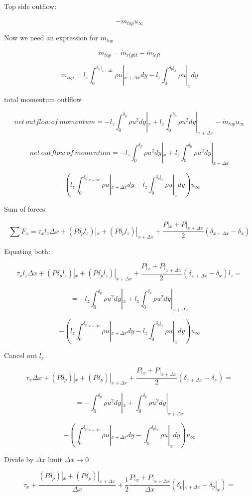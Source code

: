 \documentclass[11pt]{article}
\begin{document}
Top side outflow:

$$- \dot{m}_{top} u_\infty $$

Now we need an expression for $\dot{m}_{top}$

$$\dot{m}_{top} = \dot{m}_{right} - \dot{m}_{left}$$

$$\dot{m}_{top} = l_z \int_0^{\delta_p |_{x+\Delta x}} \rho u |_{x+ \Delta x}dy -  l_z \int_0^{\delta_p |_{x}} \rho u |_{x}dy$$

total momentum outlflow

$$net \ outflow \ of  \ momentum = - l_z \int_0^{\delta_p} \rho u^2 dy |_x +  l_z \int_0^{\delta_p} \rho u^2 dy |_{x+\Delta x} - \dot{m}_{top} u_\infty  $$

$$net \ outflow \ of  \ momentum = - l_z \int_0^{\delta_p} \rho u^2 dy |_x +  l_z \int_0^{\delta_p} \rho u^2 dy |_{x+\Delta x} $$

$$ - ( l_z \int_0^{\delta_p |_{x+\Delta x}} \rho u |_{x+ \Delta x}dy -  l_z \int_0^{\delta_p |_{x}} \rho u |_{x}dy) u_\infty  $$

Sum of forces:

$$\sum F_x = \tau_x l_z \Delta x + (P \delta_p l_z)|_x +  (P \delta_p l_z)|_{x+\Delta x} + \frac{P|_x + P|_{x+\Delta x}}{2} (\delta_{x+\Delta x} - \delta_{x}) $$

Equating both:

$$\tau_x l_z \Delta x + (P \delta_p l_z)|_x +  (P \delta_p l_z)|_{x+\Delta x} + \frac{P|_x + P|_{x+\Delta x}}{2} (\delta_{x+\Delta x} - \delta_{x}) l_z= $$

$$= - l_z \int_0^{\delta_p} \rho u^2 dy |_x +  l_z \int_0^{\delta_p} \rho u^2 dy |_{x+\Delta x} $$

$$ - ( l_z \int_0^{\delta_p |_{x+\Delta x}} \rho u |_{x+ \Delta x}dy -  l_z \int_0^{\delta_p |_{x}} \rho u |_{x}dy) u_\infty  $$

Cancel out $l_z$

$$\tau_x \Delta x + (P \delta_p )|_x +  (P \delta_p )|_{x+\Delta x} + \frac{P|_x + P|_{x+\Delta x}}{2} (\delta_{x+\Delta x} - \delta_{x}) = $$

$$= - \int_0^{\delta_p} \rho u^2 dy |_x +   \int_0^{\delta_p} \rho u^2 dy |_{x+\Delta x} $$

$$ - (  \int_0^{\delta_p |_{x+\Delta x}} \rho u |_{x+ \Delta x}dy -  \int_0^{\delta_p |_{x}} \rho u |_{x}dy) u_\infty  $$

Divide by $\Delta x$ limit $\Delta x \rightarrow 0 $


$$\tau_x   + \frac{(P \delta_p )|_x +  (P \delta_p )|_{x+\Delta x}}{\Delta x}  + \frac{1}{2} \frac{P|_x + P|_{x+\Delta x}}{\Delta x} (\delta_p|_{x+\Delta x} - \delta_p|_{x}) = $$
\end{document}
